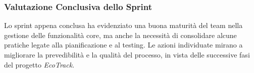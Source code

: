 \subsubsection{Valutazione Conclusiva dello Sprint}
Lo sprint appena conclusa ha evidenziato una buona maturità del team nella gestione delle funzionalità core, ma anche la necessità di consolidare alcune pratiche legate alla pianificazione e al testing. Le azioni individuate mirano a migliorare la prevedibilità e la qualità del processo, in vista delle successive fasi del progetto \textit{EcoTrack}.
